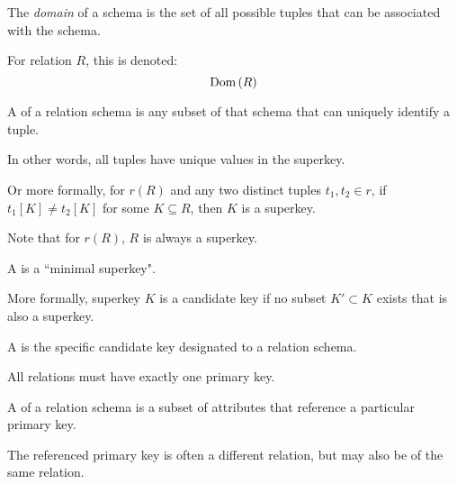 \begin{multicols}{2}
\begin{CheatsheetEntryFrame}
        The \textit{domain} of a schema is the set of all possible tuples that can be associated with the schema.

        For relation $R$, this is denoted:
        \begin{equation*}
            \operatorname{Dom}{(R)}
        \end{equation*}



        A \textit{} of a relation schema is any subset of that schema that can uniquely identify a tuple.

        In other words, all tuples have unique values in the superkey.

        Or more formally, for $r(R)$ and any two distinct tuples $t_1, t_2 \in r$, if $t_1[K] \neq t_2[K]$ for some $K \subseteq R$, then $K$ is a superkey.

        Note that for $r(R)$, $R$ is always a superkey.

        \vspace{\TextExtraSkip}%
        A \textit{} is a ``minimal superkey".

        More formally, superkey $K$ is a candidate key if no subset $K' \subset K$ exists that is also a superkey.

        \vspace{\TextExtraSkip}%
        A \textit{} is the specific candidate key designated to a relation schema.

        All relations must have exactly one primary key.

        \vspace{\TextExtraSkip}%
        A \textit{} of a relation schema is a subset of attributes that reference a particular primary key.

        The referenced primary key is often a different relation, but may also be of the same relation.

        


\end{CheatsheetEntryFrame}
\end{multicols}
